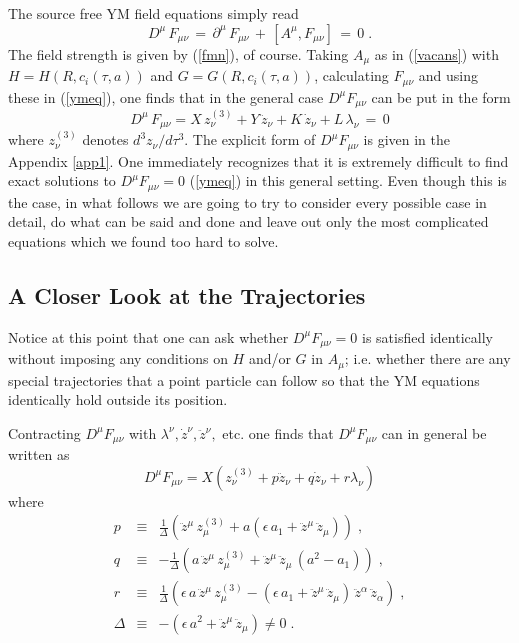 \documentclass[a4paper,twocolumn,prd,showpacs,amsmath,amssymb]{revtex4}
\begin{document}
The source free YM field equations simply read
\begin{equation}
D^{\mu} \, F_{\mu\nu} \, = \, \partial^{\mu} \, F_{\mu\nu} \, +
\, [A^{\mu},F_{\mu\nu}] \, = \, 0 \; .
\label{ymeq}
\end{equation}
The field strength is given by (\ref{fmn}), of course. Taking $A_{\mu}$
as in (\ref{vacans}) with \(H=H(R,c_i (\tau,a)) \) and \(G=G(R,c_i (\tau,a)) \),
calculating $F_{\mu\nu}$ and using these in (\ref{ymeq}), one finds that in the
general case $D^{\mu} F_{\mu\nu}$ can be put in the form
\begin{equation}
D^{\mu} \, F_{\mu\nu} = X \, z^{(3)}_{\nu} + Y \, \ddot{z}_{\nu}
+ K \, \dot{z}_{\nu} + L \, \lambda_{\nu} \label{xykl} \, = \, 0
\end{equation}
where $z^{(3)}_{\nu}$ denotes $d^{3} z_{\nu} / d \tau^3$. The explicit form of
$D^{\mu} F_{\mu\nu}$ is given in the Appendix \ref{app1}. One immediately
recognizes that it is extremely difficult to find exact solutions to
$D^{\mu} F_{\mu\nu} = 0$ (\ref{ymeq}) in this general setting. Even though
this is the case, in what follows we are going to try to consider every
possible case in detail, do what can be said and done and leave out only
the most complicated equations which we found too hard to solve.

\subsection{\label{traj} A Closer Look at the Trajectories}

Notice at this point that one can ask whether $D^{\mu} F_{\mu\nu} = 0$ is
satisfied identically without imposing any conditions on $H$ and/or $G$ in
$A_{\mu}$; i.e. whether there are any special trajectories that a point
particle can follow so that the YM equations identically hold outside its
position.

Contracting $D^{\mu} F_{\mu\nu}$ with $\lambda^{\nu}, \dot{z}^{\nu}, \ddot{z}^{\nu},$
etc. one finds that $D^{\mu} F_{\mu\nu}$ can in general be written as
\[ D^{\mu} F_{\mu\nu} = X (z^{(3)}_{\nu}
+ p \ddot{z}_{\nu} + q \dot{z}_{\nu} + r \lambda_{\nu}) \]
where
\begin{eqnarray*}
p & \equiv & \frac{1}{\Delta} (\ddot{z}^{\mu} \, z^{(3)}_{\mu} + a (\epsilon \, a_{1}
+ \ddot{z}^{\mu} \, \ddot{z}_{\mu})) \; , \\
q & \equiv & - \frac{1}{\Delta} (a \, \ddot{z}^{\mu} \, z^{(3)}_{\mu}
+ \ddot{z}^{\mu} \, \ddot{z}_{\mu} \, (a^{2}- a_{1})) \; , \\
r & \equiv & \frac{1}{\Delta} (\epsilon \, a \, \ddot{z}^{\mu} \, z^{(3)}_{\mu}
- (\epsilon \, a_{1} + \ddot{z}^{\mu} \, \ddot{z}_{\mu}) \, \ddot{z}^{\alpha} \, \ddot{z}_{\alpha}) \; , \\
\Delta & \equiv & - (\epsilon \, a^2 + \ddot{z}^{\mu} \, \ddot{z}_{\mu}) \neq 0 \; .
\end{eqnarray*}
\end{document}
